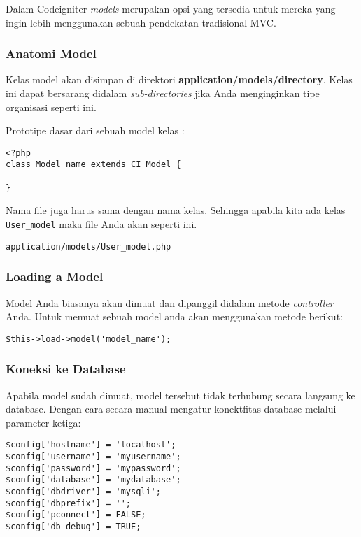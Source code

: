 \begin{enumerate}
Dalam Codeigniter \textit{models} merupakan opsi yang tersedia untuk mereka yang ingin lebih menggunakan sebuah pendekatan tradisional MVC.

\subsubsection{Anatomi Model}
\label{sssec:model_1}

Kelas model akan disimpan di direktori \textbf{application/models/directory}. Kelas ini dapat bersarang didalam \textit{sub-directories} jika Anda menginginkan tipe organisasi seperti ini. 

Prototipe dasar dari sebuah model kelas :
\begin{lstlisting}[label=phpheg, frame=single]  
<?php
class Model_name extends CI_Model {

}
\end{lstlisting}

Nama file juga harus sama dengan nama kelas. Sehingga apabila kita ada kelas \verb|User_model| maka file Anda akan seperti ini.

\begin{lstlisting}[label=phpheg, frame=single]  
application/models/User_model.php
\end{lstlisting}

\subsubsection{Loading a Model}
\label{sssec:model_2}

Model Anda biasanya akan dimuat dan dipanggil didalam metode \textit{controller} Anda. Untuk memuat sebuah model anda akan menggunakan metode berikut:

\begin{lstlisting}[label=phpheg, frame=single] 
$this->load->model('model_name');
\end{lstlisting}

\subsubsection{Koneksi ke Database}
\label{sssec:model_3}
Apabila model sudah dimuat, model tersebut tidak terhubung secara langsung ke database. Dengan cara secara manual mengatur konektfitas database melalui parameter ketiga:

\begin{lstlisting}[label=phpheg, frame=single]
$config['hostname'] = 'localhost';
$config['username'] = 'myusername';
$config['password'] = 'mypassword';
$config['database'] = 'mydatabase';
$config['dbdriver'] = 'mysqli';
$config['dbprefix'] = '';
$config['pconnect'] = FALSE;
$config['db_debug'] = TRUE;


\end{lstlisting}
\end{enumerate}
